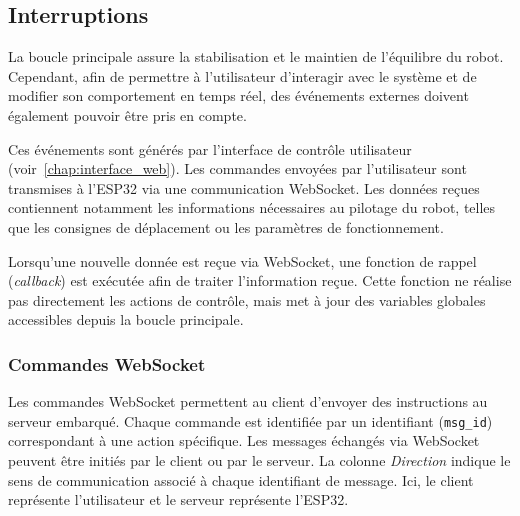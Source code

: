 \subsection{Interruptions}

La boucle principale assure la stabilisation et le maintien de l'équilibre du robot. Cependant, afin de permettre à l'utilisateur d'interagir avec le système et de modifier son comportement en temps réel, des événements externes doivent également pouvoir être pris en compte.

Ces événements sont générés par l'interface de contrôle utilisateur (voir~\ref{chap:interface_web}). Les commandes envoyées par l'utilisateur sont transmises à l'ESP32 via une communication WebSocket. Les données reçues contiennent notamment les informations nécessaires au pilotage du robot, telles que les consignes de déplacement ou les paramètres de fonctionnement.

Lorsqu'une nouvelle donnée est reçue via WebSocket, une fonction de rappel (\textit{callback}) est exécutée afin de traiter l'information reçue. Cette fonction ne réalise pas directement les actions de contrôle, mais met à jour des variables globales accessibles depuis la boucle principale.

\subsubsection{Commandes WebSocket}
\label{subsubsection:web_socket}
Les commandes WebSocket permettent au client d'envoyer des instructions au serveur embarqué. Chaque commande est identifiée par un identifiant (\texttt{msg\_id}) correspondant à une action spécifique.
Les messages échangés via WebSocket peuvent être initiés par le client ou par le serveur. La colonne \textit{Direction} indique le sens de communication associé à chaque identifiant de message.
Ici, le client représente l'utilisateur et le serveur représente l'ESP32.

